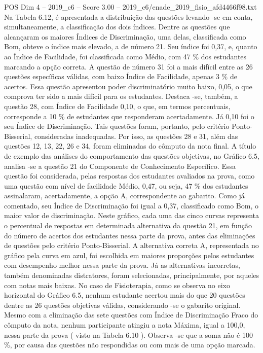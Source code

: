 \begin{textsample}{POS Dim 4 – 2019\_c6 – Score 3.00 – 2019\_c6/enade\_2019\_fisio\_afd4466f98.txt}
Na Tabela 6.12, é apresentada a distribuição das questões levando -se em conta, simultaneamente, a classificação dos dois índices.
Dentre as questões que alcançaram os maiores Índices de Discriminação, uma delas, classificada como Bom, obteve o índice mais elevado, a de número 21.
Seu índice foi 0,37, e, quanto ao Índice de Facilidade, foi classificada como Médio, com 47 \% dos estudantes marcando a opção correta.
A questão de número 31 foi a mais difícil entre as 26 questões específicas válidas, com baixo Índice de Facilidade, apenas 3 \% de acertos.
Essa questão apresentou poder discriminatório muito baixo, 0,05, o que comprova ter sido a mais difícil para os estudantes.
Destaca -se, também, a questão 28, com Índice de Facilidade 0,10, o que, em termos percentuais, corresponde a 10 \% de estudantes que responderam acertadamente.
Já 0,10 foi o seu Índice de Discriminação.
Tais questões foram, portanto, pelo critério Ponto-Bisserial, consideradas inadequadas.
Por isso, as questões 28 e 31, além das questões 12, 13, 22, 26 e 34, foram eliminadas do cômputo da nota final.
A título de exemplo das análises do comportamento das questões objetivas, no Gráfico 6.5, analisa -se a questão 21 do Componente de Conhecimento Específico.
Essa questão foi considerada, pelas respostas dos estudantes avaliados na prova, como uma questão com nível de facilidade Médio, 0,47, ou seja, 47 \% dos estudantes assinalaram, acertadamente, a opção A, correspondente ao gabarito.
Como já comentado, seu Índice de Discriminação foi igual a 0,37, classificado como Bom, o maior valor de discriminação.
Neste gráfico, cada uma das cinco curvas representa o percentual de respostas em determinada alternativa da questão 21, em função do número de acertos dos estudantes nessa parte da prova, antes das eliminações de questões pelo critério Ponto-Bisserial.
A alternativa correta A, representada no gráfico pela curva em azul, foi escolhida em maiores proporções pelos estudantes com desempenho melhor nessa parte da prova.
Já as alternativas incorretas, também denominadas distratores, foram selecionadas, principalmente, por aqueles com notas mais baixas.
No caso de Fisioterapia, como se observa no eixo horizontal do Gráfico 6.5, nenhum estudante acertou mais do que 20 questões dentre as 26 questões objetivas válidas, considerando -se o gabarito original.
Mesmo com a eliminação das sete questões com Índice de Discriminação Fraco do cômputo da nota, nenhum participante atingiu a nota Máxima, igual a 100,0, nessa parte da prova ( visto na Tabela 6.10 ).
Observa -se que a soma não é 100 \%, por causa das questões não respondidas ou com mais de uma opção marcada.

\end{textsample}
